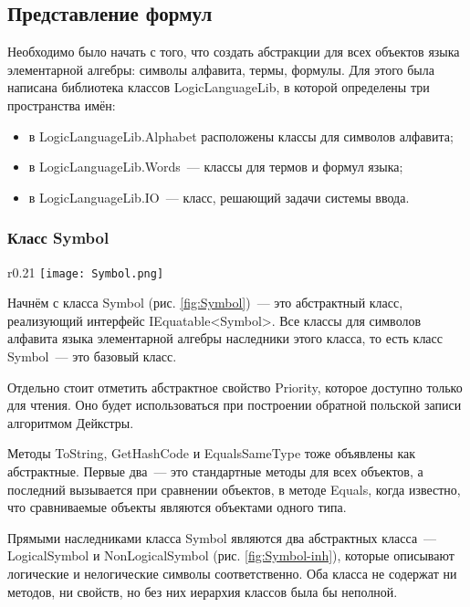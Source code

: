 \subsection{Представление формул}

Необходимо было начать с того, что создать абстракции для всех объектов языка элементарной алгебры: символы алфавита, термы, формулы. Для этого была написана библиотека классов LogicLanguageLib, в которой определены три пространства имён:
\begin{itemize}
    \item в LogicLanguageLib.Alphabet расположены классы для символов алфавита;
    \item в LogicLanguageLib.Words~--- классы для термов и формул языка;
    \item в LogicLanguageLib.IO~--- класс, решающий задачи системы ввода.
\end{itemize}

\subsubsection{Класс Symbol}

\begin{wrapfigure}{r}{0.21\textwidth}
    \texttt{[image: Symbol.png]} 
    \caption{}
    \label{fig:Symbol}
\end{wrapfigure}

Начнём с класса Symbol (рис. \ref{fig:Symbol})~--- это абстрактный класс, реализующий интерфейс IEquatable<Symbol>. Все классы для символов алфавита языка элементарной алгебры наследники этого класса, то есть класс Symbol~--- это базовый класс. 

Отдельно стоит отметить абстрактное свойство Priority, которое доступно только для чтения. Оно будет использоваться при построении обратной польской записи алгоритмом Дейкстры.

Методы ToString, GetHashCode и EqualsSameType тоже объявлены как абстрактные. Первые два~--- это стандартные методы для всех объектов, а последний вызывается при сравнении объектов, в методе Equals, когда известно, что сравниваемые объекты являются объектами одного типа.

Прямыми наследниками класса Symbol являются два абстрактных класса~--- LogicalSymbol и NonLogicalSymbol (рис. \ref{fig:Symbol-inh}), которые описывают логические и нелогические символы соответственно. Оба класса не содержат ни методов, ни свойств, но без них иерархия классов была бы неполной.

